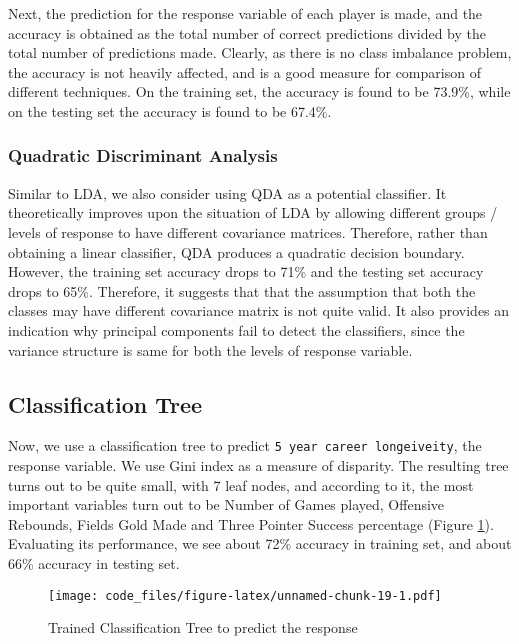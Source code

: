 \documentclass[10pt]{article}
\begin{document}
Next, the prediction for the response variable of each player is made, and the accuracy is obtained as the total number of correct predictions divided by the total number of predictions made. Clearly, as there is no class imbalance problem, the accuracy is not heavily affected, and is a good measure for comparison of different techniques. On the training set, the accuracy is found to be 73.9\%, while on the testing set the accuracy is found to be 67.4\%. 

 

\subsubsection{Quadratic Discriminant Analysis}
Similar to LDA, we also consider using QDA as a potential classifier. It theoretically improves upon the situation of LDA by allowing different groups / levels of response to have different covariance matrices. Therefore, rather than obtaining a linear classifier, QDA produces a
quadratic decision boundary. However, the training set accuracy drops to 71\% and the testing set accuracy drops to 65\%. Therefore, it suggests that that the assumption that both the classes may have different covariance matrix is not quite valid. It also provides an indication why principal components fail to detect the classifiers, since the variance structure is same for both the levels of response variable.

\subsection{Classification Tree}

Now, we use a classification tree to predict \texttt{5\ year\ career\ longeiveity}, the response variable. We use Gini index as a measure of disparity. The resulting tree turns out to be quite small, with 7 leaf nodes, and according to it, the most important variables turn out to be Number of Games played, Offensive Rebounds, Fields Gold Made and Three Pointer Success percentage (Figure \ref{fig:class-tree}). Evaluating its performance, we see about 72\% accuracy in training set, and about 66\% accuracy in testing set.

\begin{figure}[H]
	\begin{center}
		\texttt{[image: code\_files/figure-latex/unnamed-chunk-19-1.pdf]}
		\caption{Trained Classification Tree to predict the response}
		\label{fig:class-tree}
	\end{center}
\end{figure}
\end{document}
